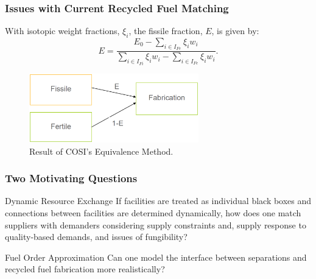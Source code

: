 \begin{frame}[ctb!]
  \frametitle{Issues with Current Recycled Fuel Matching} 
  
  With isotopic weight fractions, $\xi_i$, the fissile fraction, $E$, is given
  by:
  \begin{equation}
    E = \frac{E_0 - \sum_{i \in I_{Fe}} \xi_i w_i}
    {\sum_{i \in I_{Fi}} \xi_i w_i - \sum_{i \in I_{Fe}} \xi_i w_i}.
  \end{equation}

  \begin{figure}
    \includegraphics[height=3cm]{./images/equiv.eps}
    \caption{Result of COSI's Equivalence Method. \cite{meyer_new_2009}}
  \end{figure}
\end{frame}
  
\begin{frame}[ctb!]
  \frametitle{Two Motivating Questions}

  \begin{block}{Dynamic Resource Exchange}
    If facilities are treated as individual black boxes and connections between
    facilities are determined dynamically, how does one match suppliers with
    demanders considering supply constraints and, supply response to
    quality-based demands, and issues of fungibility?
  \end{block}

  \pause

  \begin{block}{Fuel Order Approximation}
    Can one model the interface between separations and recycled fuel
    fabrication more realistically?
  \end{block}

\end{frame}
